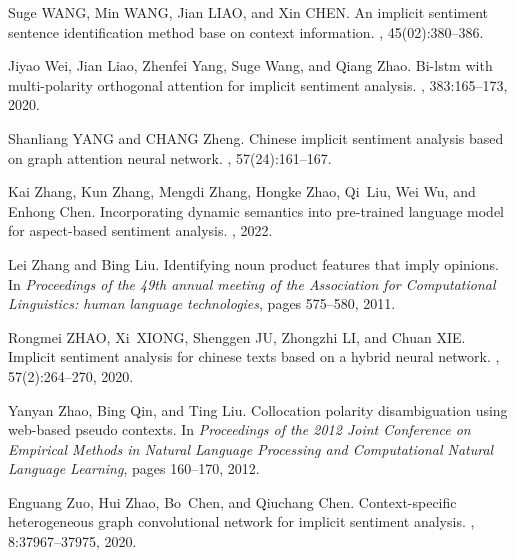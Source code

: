 \documentclass[11pt]{article}
\begin{document}
\begin{thebibliography}{10}
Suge WANG, Min WANG, Jian LIAO, and Xin CHEN.
\newblock An implicit sentiment sentence identification method base on context
  information.
,
  45(02):380--386.

Jiyao Wei, Jian Liao, Zhenfei Yang, Suge Wang, and Qiang Zhao.
\newblock Bi-lstm with multi-polarity orthogonal attention for implicit
  sentiment analysis.
, 383:165--173, 2020.

Shanliang YANG and CHANG Zheng.
\newblock Chinese implicit sentiment analysis based on graph attention neural
  network.
, 57(24):161--167.

Kai Zhang, Kun Zhang, Mengdi Zhang, Hongke Zhao, Qi~Liu, Wei Wu, and Enhong
  Chen.
\newblock Incorporating dynamic semantics into pre-trained language model for
  aspect-based sentiment analysis.
, 2022.

Lei Zhang and Bing Liu.
\newblock Identifying noun product features that imply opinions.
\newblock In {\em Proceedings of the 49th annual meeting of the Association for
  Computational Linguistics: human language technologies}, pages 575--580,
  2011.

Rongmei ZHAO, Xi~XIONG, Shenggen JU, Zhongzhi LI, and Chuan XIE.
\newblock Implicit sentiment analysis for chinese texts based on a hybrid
  neural network.
,
  57(2):264--270, 2020.

Yanyan Zhao, Bing Qin, and Ting Liu.
\newblock Collocation polarity disambiguation using web-based pseudo contexts.
\newblock In {\em Proceedings of the 2012 Joint Conference on Empirical Methods
  in Natural Language Processing and Computational Natural Language Learning},
  pages 160--170, 2012.

Enguang Zuo, Hui Zhao, Bo~Chen, and Qiuchang Chen.
\newblock Context-specific heterogeneous graph convolutional network for
  implicit sentiment analysis.
, 8:37967--37975, 2020.

\end{thebibliography}
\end{document}
